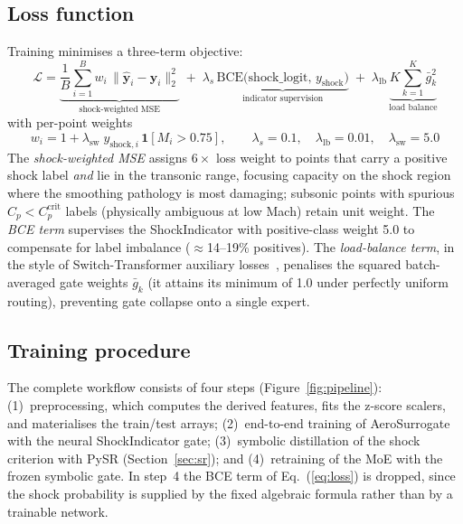 \documentclass{WCCM-ECCOMAS_2026_Full_Paper}
\begin{document}
\subsection{Loss function}
\label{sec:loss}

Training minimises a three-term objective:
\begin{equation}
  \mathcal{L} =
    \underbrace{\frac{1}{B}\sum_{i=1}^{B} w_i\,
      \|\hat{\mathbf{y}}_i - \mathbf{y}_i\|_{2}^{2}}_{\text{shock-weighted MSE}}
    \;+\; \lambda_{s}\,
    \underbrace{\mathrm{BCE}\bigl(\mathrm{shock\_logit},\,
      y_{\mathrm{shock}}\bigr)}_{\text{indicator supervision}}
    \;+\; \lambda_{\mathrm{lb}}\,
    \underbrace{K\sum_{k=1}^{K}\bar{g}_{k}^{2}}_{\text{load balance}}
  \label{eq:loss}
\end{equation}
with per-point weights
\begin{equation}
  w_i = 1 + \lambda_{\mathrm{sw}}\;y_{\mathrm{shock},i}\,
        \mathbf{1}\!\left[M_i > 0.75\right],
  \qquad
  \lambda_{s}=0.1,\quad \lambda_{\mathrm{lb}}=0.01,\quad
  \lambda_{\mathrm{sw}}=5.0
  \label{eq:weights}
\end{equation}
The \emph{shock-weighted MSE} assigns $6\times$ loss weight to points
that carry a positive shock label \emph{and} lie in the transonic
range, focusing capacity on the shock region where the smoothing
pathology is most damaging; subsonic points with spurious
$C_p<C_p^{\mathrm{crit}}$ labels (physically ambiguous at low Mach)
retain unit weight.  The \emph{BCE term} supervises the
ShockIndicator with positive-class weight 5.0 to compensate for label
imbalance ($\approx$14--19\% positives).  The \emph{load-balance
term}, in the style of Switch-Transformer auxiliary
losses~\cite{Shazeer2017,Fedus2022}, penalises the squared
batch-averaged gate weights $\bar{g}_k$ (it attains its minimum of
1.0 under perfectly uniform routing), preventing gate collapse onto a
single expert.

\subsection{Training procedure}
\label{sec:training}

The complete workflow consists of four steps
(Figure~\ref{fig:pipeline}): (1)~preprocessing, which computes the
derived features, fits the z-score scalers, and materialises the
train/test arrays; (2)~end-to-end training of AeroSurrogate with the
neural ShockIndicator gate; (3)~symbolic distillation of the shock
criterion with PySR (Section~\ref{sec:sr}); and (4)~retraining of the
MoE with the frozen symbolic gate.  In step~4 the BCE term of
Eq.~(\ref{eq:loss}) is dropped, since the shock probability is
supplied by the fixed algebraic formula rather than by a trainable
network.
\end{document}
